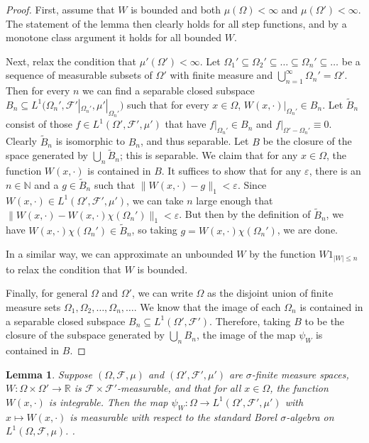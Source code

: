 \documentclass{amsart}
\numberwithin{equation}{section}
\numberwithin{figure}{section}
\newtheorem{lemma}[theorem]{Lemma}
\theoremstyle{definition}
\theoremstyle{remark}
\newcommand{\RR}{\mathbb{R}}
\newcommand{\NN}{\mathbb{N}}
\newcommand{\cF}{\mathcal{F}}
\begin{document}
\begin{proof}
First, assume that $W$ is bounded and both $\mu(\Omega)<\infty$ and
$\mu(\Omega')<\infty$. The statement of the lemma then clearly holds for all
step functions, and by a monotone class argument it holds for all bounded
$W$.

Next, relax the condition that $\mu'(\Omega')<\infty$. Let $\Omega_1'
\subseteq \Omega_2' \subseteq \dots \subseteq \Omega_n' \subseteq \dots$ be a
sequence of measurable subsets of $\Omega'$ with finite measure and
$\bigcup_{n=1}^\infty \Omega_n'=\Omega'$. Then for every $n$ we can find a
separable closed subspace $B_n \subseteq
L^1(\Omega_n',{\cF'|_{\Omega_n'},\mu'|_{\Omega_n'})}$ such that for every $x
\in \Omega$, $W(x,\cdot)|_{\Omega_n'} \in B_n$. Let $\widetilde{B}_n$ consist
of those $f \in L^1(\Omega',\cF'{,\mu'})$ that have $f|_{\Omega_n'} \in B_n$
and $f|_{\Omega'-\Omega_n'} \equiv 0$. Clearly $\widetilde{B}_n$ is
isomorphic to $B_n$, and thus separable. Let $B$ be the closure of the space
generated by $\bigcup_n \widetilde{B}_n${;} this is separable. We claim that
for any $x \in \Omega$, the function $W(x,\cdot)$ is contained in $B$. It
suffices to show that for any $\varepsilon$, there is an $n\in\NN$ and a $g
\in \widetilde{B}_n$ such that $\|W(x,\cdot)-g\|_1 <\varepsilon$. Since
$W(x,\cdot)\in L^1(\Omega',\cF'{,\mu'})$, we can take $n$ large enough that
$\|W(x,\cdot)-W(x,\cdot)\chi(\Omega_n')\|_1<\varepsilon$. But then by the
definition of $\widetilde{B}_n$, we have $W(x,\cdot)\chi(\Omega_n') \in
\widetilde{B}_n$, so taking $g=W(x,\cdot)\chi(\Omega_n')$, we are done.

In a similar way, we can approximate an unbounded $W$ by the function
$W1_{|W|\leq n}$ to relax the condition that $W$ is bounded.

Finally, for general $\Omega$ and $\Omega'$, we can write $\Omega$ as the
disjoint union of finite measure sets
$\Omega_1,\Omega_2,\dots,\Omega_n,\dots$. We know that the image of each
$\Omega_n$ is contained in a separable closed subspace $B_n \subseteq
L^1(\Omega',\cF')$. Therefore, taking $B$ to be the closure of the subspace
generated by $\bigcup_n B_n$, the image of the map $\psi_W$ is contained in
$B$.
\end{proof}

\begin{lemma} \label{lemmamapmeasurable}
Suppose $(\Omega,\cF,\mu)$ and $(\Omega',\cF',\mu')$ are $\sigma$-finite
measure spaces, $W\colon \Omega \times \Omega' \rightarrow {\RR}$ is $\cF
\times \cF'$-measurable, and that for all $x\in\Omega$, the function
$W(x,\cdot)$ is integrable. Then the map $\psi_W\colon \Omega \rightarrow
L^1(\Omega',\cF'{,\mu'})$ with $x \mapsto W(x,\cdot)$ is measurable with
respect to the standard Borel $\sigma$-algebra on $L^1(\Omega,\cF,\mu)$. .
\end{lemma}
\end{document}
